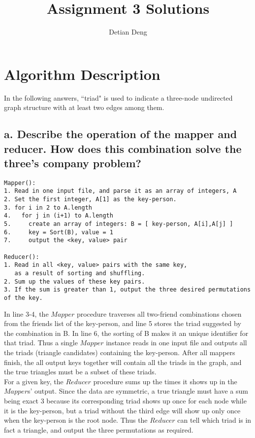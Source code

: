 \documentclass[11 pt, a4paper]{article}  %
\title{Assignment 3 Solutions}
\author{Detian Deng}
\begin{document}
\maketitle


\section{Algorithm Description}
In the following answers, ``triad" is used to indicate a three-node undirected graph structure with at least two edges among them.\\
\subsection*{a. Describe the operation of the mapper and reducer. How does this combination solve the three's company problem?} 
\begin{verbatim}
Mapper():
1. Read in one input file, and parse it as an array of integers, A
2. Set the first integer, A[1] as the key-person.
3. for i in 2 to A.length
4.   for j in (i+1) to A.length
5.     create an array of integers: B = [ key-person, A[i],A[j] ]
6.     key = Sort(B), value = 1
7.     output the <key, value> pair
 
Reducer():
1. Read in all <key, value> pairs with the same key, 
   as a result of sorting and shuffling.
2. Sum up the values of these key pairs.
3. If the sum is greater than 1, output the three desired permutations of the key.
\end{verbatim}

In line 3-4, the $Mapper$ procedure traverses all two-friend combinations chosen from the friends list of the key-person, and line 5 stores the triad suggested by the combination in B. In line 6, the sorting  of B makes it an unique identifier for that triad.
Thus a single $Mapper$ instance reads in one input file and outputs all the triads (triangle candidates) containing the key-person. After all mappers finish, the all output keys together will contain all the triads in the graph, and the true triangles must be a subset of these triads.\\

For a given key, the $Reducer$ procedure sums up the times it shows up in the $Mapper$s' output. Since the data are symmetric, a true triangle must have a sum being exact $3$ because its corresponding triad shows up once for each node while it is the key-person, but a triad without the third edge will show up only once when the key-person is the root node. Thus the $Reducer$ can tell which triad is in fact a triangle, and output the three permutations as required.
\end{document}
